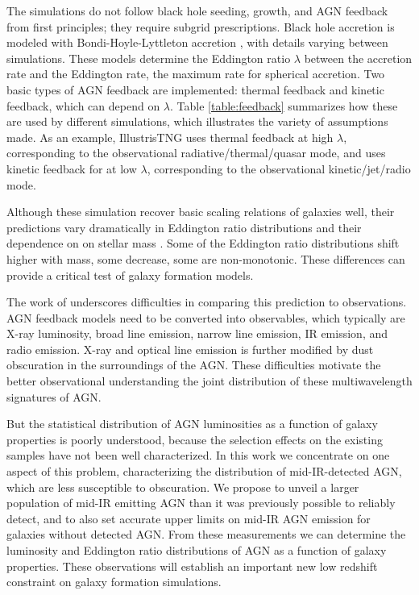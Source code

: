 \documentclass[12pt, preprint]{hacked-aastex}
\begin{document}
The simulations do not follow black hole seeding, growth, and AGN
feedback from first principles; they require subgrid prescriptions.
Black hole accretion is modeled with Bondi-Hoyle-Lyttleton accretion
\cite{edgar04a}, with details varying between simulations.  These
models determine the Eddington ratio $\lambda$ between the accretion
rate and the Eddington rate, the maximum rate for spherical accretion.
Two basic types of AGN feedback are implemented: thermal feedback and
kinetic feedback, which can depend on $\lambda$. Table
\ref{table:feedback} summarizes how these are used by different
simulations, which illustrates the variety of assumptions made.  As an
example, IllustrisTNG uses thermal feedback at high $\lambda$,
corresponding to the observational radiative/thermal/quasar mode, and
uses kinetic feedback for at low $\lambda$, corresponding to the
observational kinetic/jet/radio mode.

Although these simulation recover basic scaling relations of galaxies
well, their predictions vary dramatically in Eddington ratio
distributions and their dependence on on stellar mass
\cite{habouzit22a}. Some of the Eddington ratio distributions shift
higher with mass, some decrease, some are non-monotonic.  These
differences can provide a critical test of galaxy formation models.

The work of \cite{habouzit22a} underscores difficulties in comparing
this prediction to observations. AGN feedback models need to be
converted into observables, which typically are X-ray luminosity,
broad line emission, narrow line emission, IR emission, and radio
emission. X-ray and optical line emission is further modified by dust
obscuration in the surroundings of the AGN. These difficulties
motivate the better observational understanding the joint distribution
of these multiwavelength signatures of AGN.

But the statistical distribution of AGN luminosities as a function of
galaxy properties is poorly understood, because the selection effects
on the existing samples have not been well characterized. In this work
we concentrate on one aspect of this problem, characterizing the
distribution of mid-IR-detected AGN, which are less susceptible to
obscuration.  We propose to unveil a larger population of mid-IR
emitting AGN than it was previously possible to reliably detect, and
to also set accurate upper limits on mid-IR AGN emission for galaxies
without detected AGN. From these measurements we can determine the
luminosity and Eddington ratio distributions of AGN as a function of
galaxy properties.  These observations will establish an important new
low redshift constraint on galaxy formation simulations.
\end{document}
